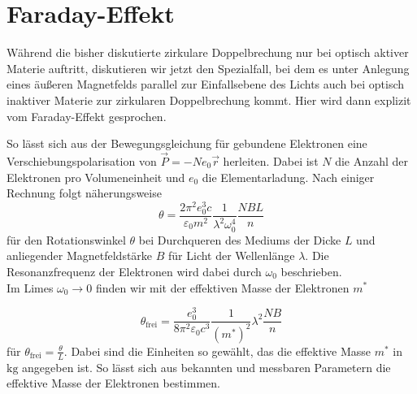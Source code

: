 \section{Faraday-Effekt}

Während die bisher diskutierte zirkulare Doppelbrechung nur bei optisch aktiver Materie auftritt, diskutieren wir jetzt den Spezialfall, 
bei dem es unter Anlegung eines äußeren Magnetfelds parallel zur Einfallsebene des Lichts auch bei optisch inaktiver Materie zur zirkularen Doppelbrechung kommt.
Hier wird dann explizit vom Faraday-Effekt gesprochen.

So lässt sich aus der Bewegungsgleichung für gebundene Elektronen eine Verschiebungspolarisation von $\vec{P} = - N e_0 \vec{r}$ herleiten.
Dabei ist $N$ die Anzahl der Elektronen pro Volumeneinheit und $e_0$ die Elementarladung.
Nach einiger Rechnung folgt näherungsweise
\begin{equation*}
    \theta = \frac{2 \pi^2 e^3_0 c}{\varepsilon_0 m^2} \frac{1}{ \lambda^2 \omega_0^4} \frac{N B L}{n}
\end{equation*}
für den Rotationswinkel $\theta$ bei Durchqueren des Mediums der Dicke $L$ und anliegender Magnetfeldstärke $B$ für Licht der Wellenlänge $\lambda$.
Die Resonanzfrequenz der Elektronen wird dabei durch $\omega_0$ beschrieben. \\

Im Limes $\omega_0 \rightarrow 0$ finden wir mit der effektiven Masse der Elektronen $m^*$

\begin{equation}
    \theta_\text{frei} = \frac{e^3_0}{8 \pi^2 \varepsilon_0 c^3} \frac{1}{(m^*)^2} \lambda^2 \frac{N B}{n}
\end{equation}
für $\theta_\text{frei} = \frac{\theta}{L}$.
Dabei sind die Einheiten so gewählt, das die effektive Masse $m^*$ in $\si{\kilo\gram}$ angegeben ist.
So lässt sich aus bekannten und messbaren Parametern die effektive Masse der Elektronen bestimmen.


